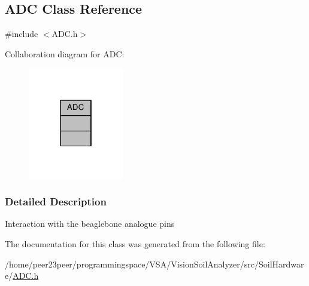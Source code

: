 \hypertarget{class_a_d_c}{}\subsection{A\+D\+C Class Reference}
\label{class_a_d_c}


{\ttfamily \#include $<$A\+D\+C.\+h$>$}



Collaboration diagram for A\+D\+C\+:
\nopagebreak
\begin{figure}[H]
\begin{center}
\leavevmode
\includegraphics[width=118pt]{class_a_d_c__coll__graph}
\end{center}
\end{figure}


\subsubsection{Detailed Description}
Interaction with the beaglebone analogue pins 

The documentation for this class was generated from the following file\+:\begin{DoxyCompactItemize}
\item 
/home/peer23peer/programmingspace/\+V\+S\+A/\+Vision\+Soil\+Analyzer/src/\+Soil\+Hardware/\hyperlink{_a_d_c_8h}{A\+D\+C.\+h}\end{DoxyCompactItemize}
